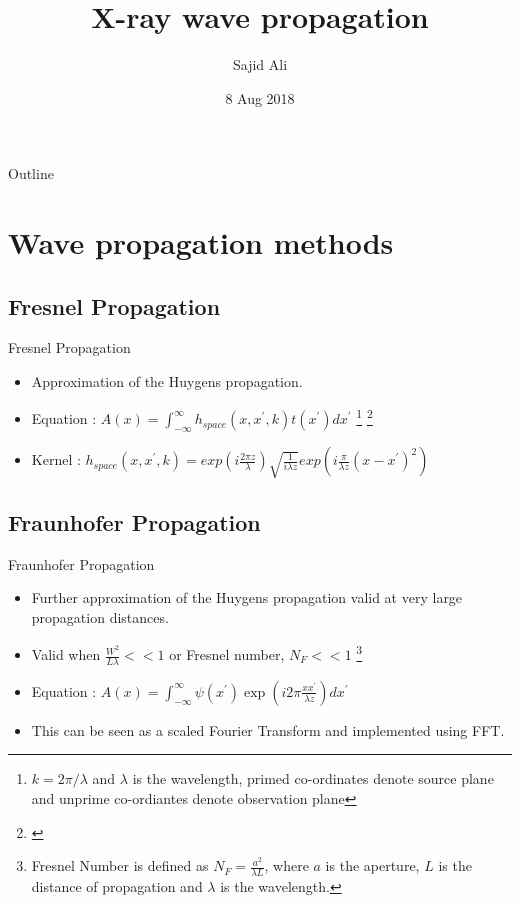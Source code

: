 \documentclass{beamer}
\title{X-ray wave propagation }
\author{Sajid Ali\inst{1}}
\institute[NU] %
{
  \inst{1}%
  Applied Physics\\
  Northwestern Univ}
\date{8 Aug 2018}
\begin{document}
\begin{frame}
  \titlepage
\end{frame}

\begin{frame}{Outline}
  \tableofcontents
\end{frame}

\section{Wave propagation methods}

\subsection{Fresnel Propagation}

\begin{frame}{Fresnel Propagation}
  \begin{itemize}
  \item Approximation of the Huygens propagation.
  \item {Equation : $A(x) = \int_{-\infty}^{\infty}h_{space}(x,x^{'},k)t(x^{'})dx^{'}$}
  \footnote{$k = 2\pi/\lambda$ and $\lambda$ is the wavelength, primed co-ordinates denote source plane and unprime co-ordiantes denote observation plane }
  \footnote{\cite{Hanna2011}}
  \item {Kernel : $h_{space}(x,x^{'},k) = exp(i\frac{2\pi z}{\lambda})\sqrt{\frac{1}{i\lambda z}}exp(i\frac{\pi}{\lambda z}(x-x^{'})^2)$}

  
  \end{itemize}
\end{frame}

\subsection{Fraunhofer Propagation}

\begin{frame}{Fraunhofer Propagation}
\begin{itemize}
	\item Further approximation of the Huygens propagation valid at very large propagation distances.
	\item Valid when $\frac{W^{2}}{L\lambda}<<1$ or Fresnel number, $N_{F}<<1$
	\footnote{Fresnel Number is defined as $N_{F}=\frac{a^{2}}{\lambda L}$, where $a$ is the aperture, $L$ is the distance of propagation and $\lambda$ is the wavelength.}
  \item {Equation : $A(x) = \int_{-\infty}^{\infty}\psi(x^{'})\exp(i2\pi\frac{xx^{'}}{\lambda z})dx^{'}$}
	\item This can be seen as a scaled Fourier Transform and implemented using FFT.

\end{itemize}
\end{frame}
\end{document}
